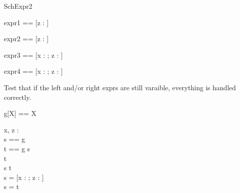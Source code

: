 \begin{zsection}
  \SECTION SchExpr2
\end{zsection}

\begin{zed} expr1 == [z : \nat] \land [z : \nat] \end{zed}
\begin{zed} expr2 == [z : \nat]  \end{zed}
\begin{zed} expr3 == [x : \nat; z : \nat] \land [z : \nat] \end{zed}
\begin{zed} expr4 == [x : \nat; z : \nat]  \end{zed}

Test that if the left and/or right exprs are still varaible, everything 
is handled correctly.
\begin{zed}
  g[X] == X
\end{zed}

\begin{axdef}
  x, z : \nat\\
  s == g\\
  t == g
\where
  s \land [x : \nat]\\
  [z : \nat] \land t\\
  s \land t\\
  s = [x : \nat; z : \nat]\\
  s = t
\end{axdef}
